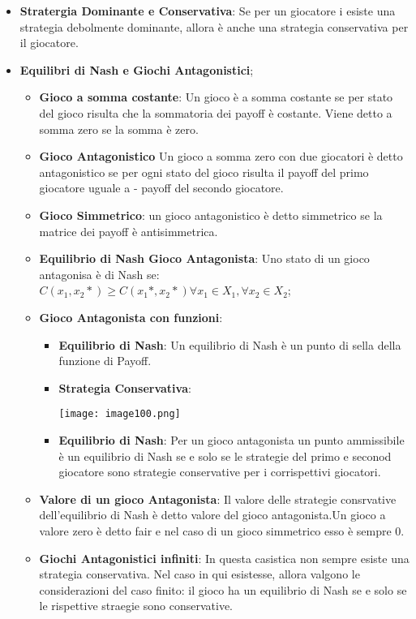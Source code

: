 \documentclass{article}
\theoremstyle{definition}
\theoremstyle{remark}
\begin{document}
\begin{itemize}
    \item \textbf{Stratergia Dominante e Conservativa}: Se per un giocatore i esiste una strategia debolmente dominante, allora è anche una strategia conservativa per il giocatore.
    \item \textbf{Equilibri di Nash e Giochi Antagonistici};\begin{itemize}
        \item \textbf{Gioco a somma costante}: Un gioco è a somma costante se per stato del gioco risulta che la sommatoria dei payoff è costante. Viene detto a somma zero se la somma è zero.
        \item \textbf{Gioco Antagonistico} Un gioco a somma zero con due giocatori è detto antagonistico se per ogni stato del gioco risulta il payoff del primo giocatore uguale a - payoff del secondo giocatore.
        \item \textbf{Gioco Simmetrico}: un gioco antagonistico è detto simmetrico se la matrice dei payoff è antisimmetrica.
        \item \textbf{Equilibrio di Nash Gioco Antagonista}: Uno stato di un gioco antagonisa è di Nash se: $C(x_1,x_2*)\geq C(x_1*,x_2*)\forall x_1\in X_1,\forall x_2\in X_2$;
        \item \textbf{Gioco Antagonista con funzioni}:\begin{itemize}
            \item \textbf{Equilibrio di Nash}: Un equilibrio di Nash è un punto di sella della funzione di Payoff.
            \item \textbf{Strategia Conservativa}:
            \begin{center}
                \texttt{[image: image100.png]}
            \end{center}
            \item \textbf{Equilibrio di Nash}: Per un gioco antagonista un punto ammissibile è un equilibrio di Nash se e solo se le strategie del primo e seconod giocatore sono strategie conservative per i corrispettivi giocatori.
        \end{itemize}
        \item \textbf{Valore di un gioco Antagonista}: Il valore delle strategie consrvative dell'equilibrio di Nash è detto valore del gioco antagonista.\newline Un gioco a valore zero è detto fair e nel caso di un gioco simmetrico esso è sempre 0.
        \item \textbf{Giochi Antagonistici infiniti}: In questa casistica non sempre esiste una strategia conservativa. Nel caso in qui esistesse, allora valgono le considerazioni del caso finito: il gioco ha un equilibrio di Nash se e solo se le rispettive straegie sono conservative.

\end{itemize}
\end{itemize}
\end{document}
